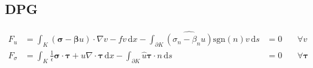 \documentclass[a4paper]{article}
\def\d{\,\mathrm{d}}
\def\dx{\d x}
\def\ds{\d s}
\def\btau{\boldsymbol\tau}
\def\bsigma{\boldsymbol\sigma}
\def\bbeta{\boldsymbol\beta}
\def\bpsi{\boldsymbol\psi}
\def\bn{\mathbf{n}}
\begin{document}
\subsection*{DPG}
\begin{align*}
F_u&=\int_K(\bsigma-\bbeta u)\cdot\nabla v-fv\dx
- \int_{\partial K}\widehat{(\sigma_n-\beta_nu)}\text{sgn}(n)v\ds
&=0 & \quad\forall v\\
F_\sigma&=\int_K\frac{1}{\epsilon}\bsigma\cdot\btau+u\nabla\cdot\btau\dx
-\int_{\partial K}\hat u\btau\cdot n\ds&=0 & \quad\forall\btau\\
\end{align*}
\end{document}
